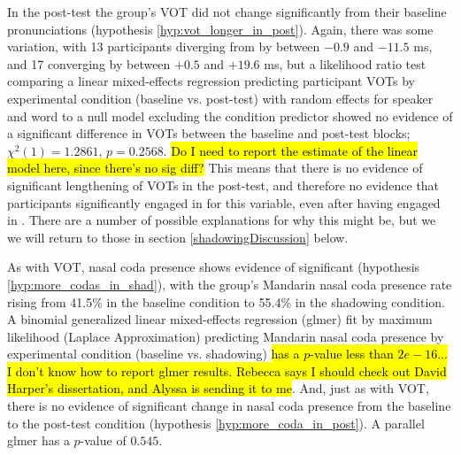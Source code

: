    In the \ND{} post-test the group's VOT did not change significantly from their \ND{} baseline pronunciations (hypothesis \ref{hyp:vot_longer_in_post}). Again, there was some variation, with 13 participants diverging from \annie{} by between $-0.9$ and $-11.5$ ms, and 17 converging by between $+0.5$ and $+19.6$ ms, but a likelihood ratio test comparing a linear mixed-effects regression predicting participant \ND{} VOTs by experimental condition (baseline vs. post-test) with random effects for speaker and word to a null model excluding the condition predictor showed no evidence of a significant difference in \ND{} VOTs between the baseline and post-test blocks; $\chi^2 (1) = 1.2861$, $p = 0.2568$. \hl{Do I need to report the estimate of the linear model here, since there's no sig diff?} This means that there is no evidence of significant lengthening of VOTs in the \ND{} post-test, and therefore no evidence that participants significantly engaged in \lta{} for this variable, even after having engaged in \sta{}. There are a number of possible explanations for why this might be, but we we will return to those in section \ref{shadowingDiscussion} below.



    As with VOT, nasal coda presence %
    shows evidence of significant \sta{} (hypothesis \ref{hyp:more_codas_in_shad}), with the group's Mandarin nasal coda presence rate rising from 41.5\% in the baseline condition to 55.4\% in the shadowing condition. A binomial generalized linear mixed-effects regression (glmer) fit by maximum likelihood (Laplace Approximation) predicting Mandarin nasal coda presence by experimental condition (baseline vs. shadowing) \hl{has a $p$-value less than $2e-16$... I don't know how to report glmer results. Rebecca says I should check out David Harper's dissertation, and Alyssa is sending it to me}. And, just as with VOT, there is no evidence of significant change in \ND{} nasal coda presence from the baseline to the post-test condition (hypothesis \ref{hyp:more_coda_in_post}). A parallel glmer has a $p$-value of $0.545$.
    

